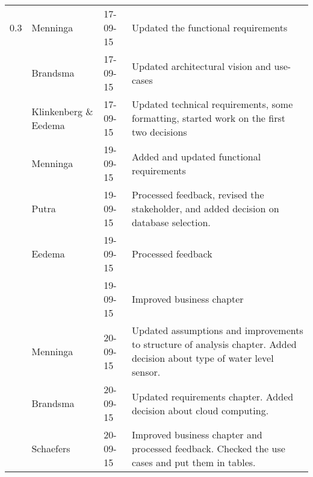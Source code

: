 \begin{longtable}{L{} L{} L{} L{}}
	0.3              & Menninga              & 17-09-15      & Updated the functional requirements                                                                                                                                                                                        \\
	                 & Brandsma              & 17-09-15      & Updated architectural vision and use-cases                                                                                                                                                                                 \\
	                 & Klinkenberg \& Eedema & 17-09-15      & Updated technical requirements, some formatting, started work on the first two decisions                                                                                                                                   \\
	                 & Menninga              & 19-09-15      & Added and updated functional requirements                                                                                                                                                                                  \\
	                 & Putra                 & 19-09-15      & Processed feedback, revised the stakeholder, and added decision on database selection.                                                                                                                                     \\
	                 & Eedema                & 19-09-15      & Processed feedback                                                                                                                                                                                                         \\
	                 &                       & 19-09-15      & Improved business chapter                                                                                                                                                                                                  \\
	                 & Menninga              & 20-09-15      & Updated assumptions and improvements to structure of analysis chapter. Added decision about type of water level sensor.                                                                                                    \\
	                 & Brandsma              & 20-09-15      & Updated requirements chapter. Added decision about cloud computing.                                                                                                                                                        \\
	                 & Schaefers             & 20-09-15      & Improved business chapter and processed feedback. Checked the use cases and put them in tables.                                                                                                                            \\
	\midrule
			

\end{longtable}
